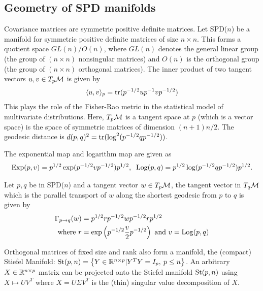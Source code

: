 \subsection*{Geometry of SPD manifolds}
Covariance matrices are symmetric positive definite matrices. 
Let SPD($n$) be a manifold for symmetric positive definite matrices of size $n\times n$. This forms a quotient space $GL(n)/O(n)$, where
$GL(n)$ denotes the general linear group (the group of $(n \times n)$ nonsingular matrices) and $O(n)$ is the orthogonal group 
(the group of $(n \times n)$ orthogonal matrices). 
%
The inner product of two tangent vectors $u,v \in T_{p}\mathcal{M}$ is given by 
\begin{equation}
\begin{split}
  \langle u,v \rangle_{p} = \operatorname{tr}(p^{-1/2}up^{-1}vp^{-1/2})
\end{split}
\label{eq:metricSPD}
\end{equation}
This plays the role of the Fisher-Rao metric in the statistical model of multivariate distributions.
Here, $T_{p}\mathcal{M}$ is a tangent space at $p$ (which is a vector space) is the space of symmetric matrices of dimension $(n+1)n/2$.
The geodesic distance is $d(p,q)^{2} = \operatorname{tr}( \log^{2}(p^{-1/2}qp^{-1/2}))$.


The exponential map and logarithm map are  given as 
\begin{equation}
\begin{split}
  \operatorname*{Exp}(p,v) = p^{1/2} \exp(p^{-1/2}vp^{-1/2})p^{1/2}, \;\;
  \operatorname*{Log}(p,q) = p^{1/2} \log(p^{-1/2}qp^{-1/2})p^{1/2}.
\end{split}
\end{equation}

Let $p, q$ be in SPD($n$) and a tangent vector $w \in T_{p}\mathcal{M}$, the
tangent vector in $T_{q}\mathcal{M}$ which is the parallel transport of $w$ along
the shortest geodesic from $p$ to $q$ is given by 
\begin{equation}
\begin{split}
\Gamma_{p \rightarrow q}(w) &= p^{1/2}rp^{-1/2}wp^{-1/2}rp^{1/2} \\
\text{where } r &= \exp \left (p^{-1/2}\frac{v}{2}p^{-1/2} \right ) \text{ and
}v = \operatorname*{Log}(p,q)
\end{split}
\end{equation}

Orthogonal matrices of fixed size and rank also form a manifold, the (compact) Stiefel Manifold: $ \text{St}(p,n)=\left\{Y \in \mathbb{R}^{n\times p} | Y^TY=I_p,\: p \leq n\right\}$.
An arbitrary $X \in \mathbb{R}^{n \times p}$ matrix can be projected onto the Stiefel manifold $\text{St}(p,n)$ using $X \mapsto UV^T$ where $X=U\Sigma V^T$ is the (thin) singular value decomposition of $X$. 